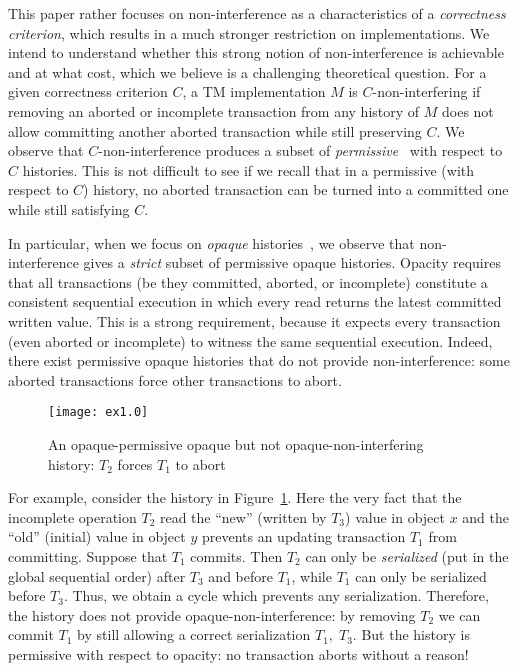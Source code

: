 \documentclass{llncs}
\begin{document}
This paper rather focuses on non-interference as a characteristics of a
\emph{correctness criterion}, which results in a much stronger restriction
on implementations. 
We intend to understand whether this strong notion of
non-interference is achievable and at what cost, which we believe is a challenging theoretical question. 
For a given correctness criterion $C$, a TM implementation $M$ is
$C$-non-interfering if removing an aborted or incomplete transaction from any
history of $M$ does not allow committing another aborted transaction
while still preserving $C$.   
We observe that
$C$-non-interference produces a subset of
\emph{permissive}~\cite{Guer+:disc:2008} with
respect to $C$ histories. This is not difficult to see if we recall
that in a permissive (with respect to $C$) history,
no aborted transaction can be turned into a committed one
while still satisfying $C$.  


In particular, when we focus on \emph{opaque}
histories~\cite{GuerKap:2008:PPoPP,tm-book}, we observe that
non-interference gives a \emph{strict} subset of permissive opaque
histories. Opacity requires that all transactions (be they committed, aborted,
or incomplete) constitute a consistent sequential execution in which
every read returns the latest committed written value.
This is a strong requirement, because it expects every transaction
(even aborted or incomplete) to
witness the same sequential execution. 
Indeed, there exist permissive  opaque histories that do
not provide non-interference: some aborted transactions force other
transactions to abort.   
\begin{figure}[tbph]
  \centering
\texttt{[image: ex1.0]}
\caption{An opaque-permissive opaque but not opaque-non-interfering history: $T_2$ forces $T_1$
    to abort}
  \label{fig:ex1}
\end{figure}

For example, consider the history in Figure~\ref{fig:ex1}. 
Here the very fact that the incomplete operation $T_2$ read the ``new''
(written by $T_3$) value
in object $x$ and the ``old'' (initial) value in object $y$ 
prevents an updating transaction $T_1$ from committing. 
Suppose that $T_1$ commits. Then $T_2$ can only be \emph{serialized} (put in the global
sequential order) after $T_3$ and before $T_1$, while $T_1$ can only be
serialized before $T_3$. Thus, we obtain a cycle which prevents any 
serialization. Therefore, the history does not provide opaque-non-interference: by removing
$T_2$ we can commit $T_1$ by still allowing a correct serialization
$T_1,\;T_3$.
But the history is permissive with respect to opacity: no transaction 
aborts without a reason!
\end{document}
